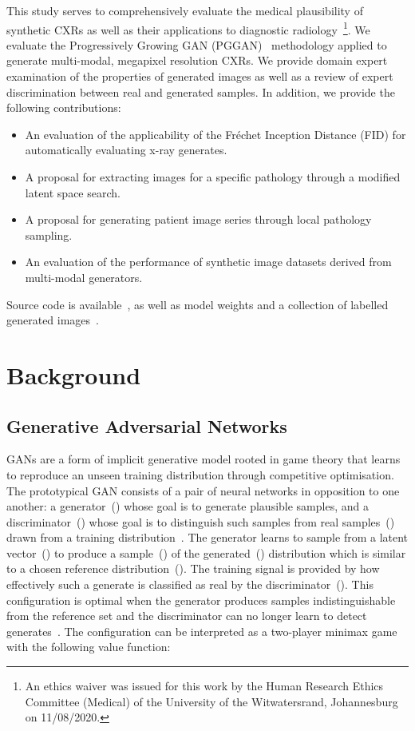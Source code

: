 \documentclass{article}
\begin{document}
This study serves to comprehensively evaluate the medical plausibility of synthetic CXRs as well as their applications to diagnostic radiology~\footnote{An ethics waiver was issued for this work by the Human Research Ethics Committee (Medical) of the University of the Witwatersrand, Johannesburg on 11/08/2020.}. We evaluate the Progressively Growing GAN (PGGAN)~\cite{karrasProgressiveGrowingGANs2018} methodology applied to generate multi-modal, megapixel resolution CXRs. We provide domain expert examination of the properties of generated images as well as a review of expert discrimination between real and generated samples. In addition, we provide the following contributions:
\begin{itemize}
\item An evaluation of the applicability of the Fréchet Inception Distance (FID) for automatically evaluating x-ray generates.
\item A proposal for extracting images for a specific pathology through a modified latent space search.
\item A proposal for generating patient image series through local pathology sampling.  
\item An evaluation of the performance of synthetic image datasets derived from multi-modal generators.
\end{itemize}

Source code is available~\cite{segal2021CXRPGGANCode}, as well as model weights and a collection of labelled generated images~\cite{segal2021CXRPGGANModel}.

\section{Background}

\subsection{Generative Adversarial Networks}
GANs are a form of implicit generative model rooted in game theory that learns to reproduce an unseen training distribution through competitive optimisation. The prototypical GAN consists of a pair of neural networks in opposition to one another: a generator~() whose goal is to generate plausible samples, and a discriminator~() whose goal is to distinguish such samples from real samples~() drawn from a training distribution~\cite{goodfellowGenerativeAdversarialNetworks2014}. The generator learns to sample from a latent vector~() to produce a sample~() of the generated~() distribution which is similar to a chosen reference distribution~(). The training signal is provided by how effectively such a generate is classified as real by the discriminator~(). This configuration is optimal when the generator produces samples indistinguishable from the reference set and the discriminator can no longer learn to detect generates~\cite{meschederWhichTrainingMethods2018,salimansImprovedTechniquesTraining2016}. The configuration can be interpreted as a two-player minimax game with the following value function:
\end{document}
